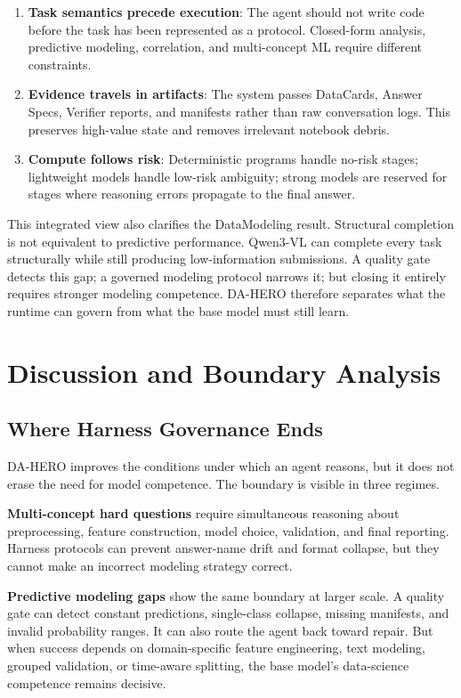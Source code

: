 \documentclass[letterpaper]{article} %
\begin{document}
\begin{enumerate}
    \item \textbf{Task semantics precede execution}: The agent should not write code before the task has been represented as a protocol.  Closed-form analysis, predictive modeling, correlation, and multi-concept ML require different constraints.
    \item \textbf{Evidence travels in artifacts}: The system passes DataCards, Answer Specs, Verifier reports, and manifests rather than raw conversation logs.  This preserves high-value state and removes irrelevant notebook debris.
    \item \textbf{Compute follows risk}: Deterministic programs handle no-risk stages; lightweight models handle low-risk ambiguity; strong models are reserved for stages where reasoning errors propagate to the final answer.
\end{enumerate}

This integrated view also clarifies the DataModeling result.  Structural completion is not equivalent to predictive performance.  Qwen3-VL can complete every task structurally while still producing low-information submissions.  A quality gate detects this gap; a governed modeling protocol narrows it; but closing it entirely requires stronger modeling competence.  DA-HERO therefore separates what the runtime can govern from what the base model must still learn.

\section{Discussion and Boundary Analysis}
\label{sec:discussion}

\subsection{Where Harness Governance Ends}

DA-HERO improves the conditions under which an agent reasons, but it does not erase the need for model competence.  The boundary is visible in three regimes.

\textbf{Multi-concept hard questions} require simultaneous reasoning about preprocessing, feature construction, model choice, validation, and final reporting.  Harness protocols can prevent answer-name drift and format collapse, but they cannot make an incorrect modeling strategy correct.

\textbf{Predictive modeling gaps} show the same boundary at larger scale.  A quality gate can detect constant predictions, single-class collapse, missing manifests, and invalid probability ranges.  It can also route the agent back toward repair.  But when success depends on domain-specific feature engineering, text modeling, grouped validation, or time-aware splitting, the base model's data-science competence remains decisive.
\end{document}
